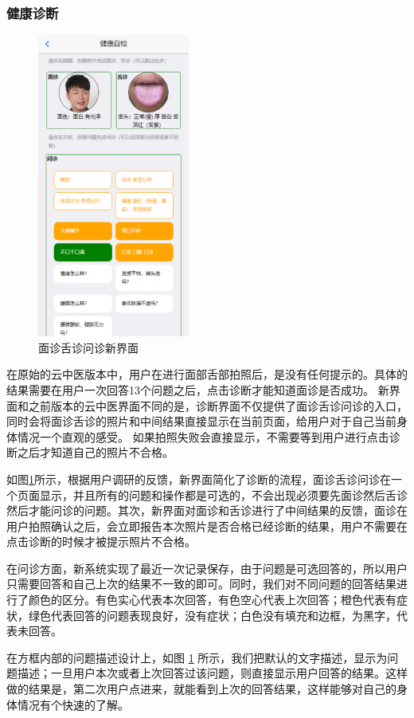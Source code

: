 \subsubsection{健康诊断}

\begin{figure}[h]
    \centering
    \includegraphics[height=10cm]{images/diag.png}
    \caption{面诊舌诊问诊新界面}
    \label{fig:diag_new}
\end{figure}
在原始的云中医版本中，用户在进行面部舌部拍照后，是没有任何提示的。具体的结果需要在用户一次回答13个问题之后，点击诊断才能知道面诊是否成功。
新界面和之前版本的云中医界面不同的是，诊断界面不仅提供了面诊舌诊问诊的入口，同时会将面诊舌诊的照片和中间结果直接显示在当前页面，给用户对于自己当前身体情况一个直观的感受。
如果拍照失败会直接显示，不需要等到用户进行点击诊断之后才知道自己的照片不合格。
    
如图\ref{fig:diag_new}所示，根据用户调研的反馈，新界面简化了诊断的流程，面诊舌诊问诊在一个页面显示，并且所有的问题和操作都是可选的，不会出现必须要先面诊然后舌诊然后才能问诊的问题。其次，新界面对面诊和舌诊进行了中间结果的反馈，面诊在用户拍照确认之后，会立即报告本次照片是否合格已经诊断的结果，用户不需要在点击诊断的时候才被提示照片不合格。

在问诊方面，新系统实现了最近一次记录保存，由于问题是可选回答的，所以用户只需要回答和自己上次的结果不一致的即可。同时，我们对不同问题的回答结果进行了颜色的区分。有色实心代表本次回答，有色空心代表上次回答；橙色代表有症状，绿色代表回答的问题表现良好，没有症状；白色没有填充和边框，为黑字，代表未回答。

在方框内部的问题描述设计上，如图 \ref{fig:diag_new} 所示，我们把默认的文字描述，显示为问题描述；一旦用户本次或者上次回答过该问题，则直接显示用户回答的结果。这样做的结果是，第二次用户点进来，就能看到上次的回答结果，这样能够对自己的身体情况有个快速的了解。

